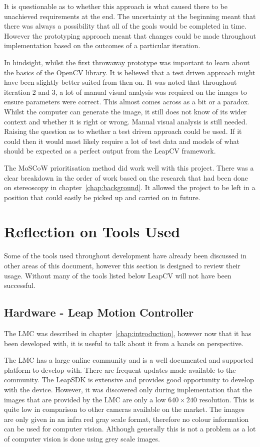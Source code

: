 \documentclass[11pt,oneside]{report}
\begin{document}
		It is questionable as to whether this approach is what caused there to be unachieved requirements at the end.
		The uncertainty at the beginning meant that there was always a possibility that all of the goals would be completed in time.
		However the prototyping approach meant that changes could be made throughout implementation based on the outcomes of a particular iteration.
		
		In hindsight, whilst the first throwaway prototype was important to learn about the basics of the OpenCV library.
		It is believed that a test driven approach might have been slightly better suited from then on.
		It was noted that throughout iteration 2 and 3, a lot of manual visual analysis was required on the images to ensure parameters were correct.
		This almost comes across as a bit or a paradox.
		Whilst the computer can generate the image, it still does not know of its wider context and whether it is right or wrong.
		Manual visual analysis is still needed.
		Raising the question as to whether a test driven approach could be used.
		If it could then it would most likely require a lot of test data and models of what should be expected as a perfect output from the LeapCV framework.
		
		The MoSCoW prioritisation method did work well with this project.
		There was a clear breakdown in the order of work based on the research that had been done on stereoscopy in chapter~\ref{chap:background}.
		It allowed the project to be left in a position that could easily be picked up and carried on in future.
		
	\section{Reflection on Tools Used}
		Some of the tools used throughout development have already been discussed in other areas of this document, however this section is designed to review their usage.
		Without many of the tools listed below LeapCV will not have been successful.
		\subsection{Hardware - Leap Motion Controller}
			The LMC was described in chapter~\ref{chap:introduction}, however now that it has been developed with, it is useful to talk about it from a hands on perspective.
			
			The LMC has a large online community and is a well documented and supported platform to develop with.
			There are frequent updates made available to the community.
			The LeapSDK is extensive and provides good opportunity to develop with the device.
			However, it was discovered only during implementation that the images that are provided by the LMC are only a low $640\times240$ resolution.
			This is quite low in comparison to other cameras available on the market.
			The images are only given in an infra red gray scale format, therefore no colour information can be used for computer vision.
			Although generally this is not a problem as a lot of computer vision is done using grey scale images.
			
\end{document}
